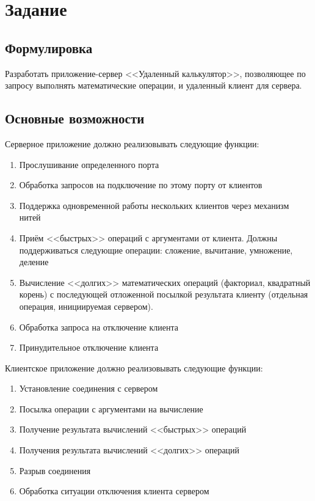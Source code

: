 





\tableofcontents
\newpage

\section{Задание}

\subsection{Формулировка}

Разработать приложение-сервер <<Удаленный калькулятор>>, позволяющее по запросу выполнять математические операции, и удаленный клиент для сервера.

\subsection{Основные возможности}

Серверное приложение должно реализовывать следующие функции:

\begin{enumerate}
	\item Прослушивание определенного порта
	\item Обработка запросов на подключение по этому порту от клиентов
	\item Поддержка одновременной работы нескольких клиентов через механизм нитей
	\item Приём <<быстрых>> операций с аргументами от клиента. Должны поддерживаться следующие операции: сложение, вычитание, умножение,
деление
	\item Вычисление <<долгих>> математических операций (факториал, квадратный корень) с последующей отложенной посылкой результата клиенту (отдельная операция, инициируемая сервером).
	\item Обработка запроса на отключение клиента
	\item Принудительное отключение клиента
\end{enumerate}

Клиентское приложение должно реализовывать следующие функции:

\begin{enumerate}
	\item Установление соединения с сервером
	\item Посылка операции с аргументами на вычисление
	\item Получение результата вычислений <<быстрых>> операций
	\item Получения результата вычислений <<долгих>> операций
	\item Разрыв соединения
	\item  Обработка ситуации отключения клиента сервером
\end{enumerate}

